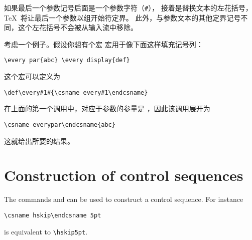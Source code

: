 \documentclass[letterpaper]{book}
\begin{document}
如果最后一个参数记号后面是一个参数字符（\verb>#>），
接着是替换文本的左花括号，\TeX\ 将让最后一个参数以组开始符定界。
此外，与参数文本的其他定界记号不同，这个左花括号不会被从输入流中移除。

考虑一个例子。假设你想有个宏  宏用于像下面这样填充记号列：
\begin{verbatim}
\every par{abc} \every display{def}
\end{verbatim}
这个宏可以定义为
\begin{verbatim}
\def\every#1#{\csname every#1\endcsname}
\end{verbatim}
在上面的第一个调用中，对应于参数的参量是 ，因此该调用展开为
\begin{verbatim}
\csname everypar\endcsname{abc}
\end{verbatim}
这就给出所要的结果。


\section{Construction of control sequences}
\label{cs:name}

The commands  and  can be used
to construct a control sequence. 
For instance
\begin{verbatim}
\csname hskip\endcsname 5pt
\end{verbatim}
is equivalent to \verb=\hskip5pt=.
\end{document}
